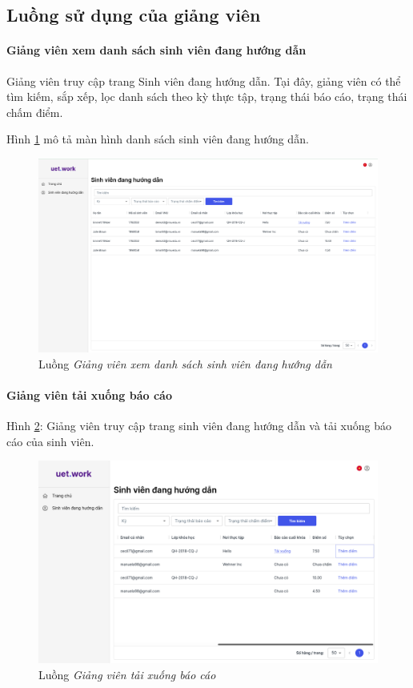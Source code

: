 \documentclass[./../main.tex]{subfiles}
\begin{document}
\subsection{Luồng sử dụng của giảng viên}

\paragraph*{Giảng viên xem danh sách sinh viên đang hướng dẫn}

Giảng viên truy cập trang Sinh viên đang hướng dẫn. Tại đây, giảng viên có thể tìm kiếm, sắp xếp, lọc danh sách theo kỳ thực tập, trạng thái báo cáo, trạng thái chấm điểm.

Hình \ref{fig:working_student_page} mô tả màn hình danh sách sinh viên đang hướng dẫn.

\begin{figure}[]
	\includegraphics[width=\linewidth]{./images/image8.png}
	\caption{Luồng \emph{Giảng viên xem danh sách sinh viên đang hướng dẫn}}
	\label{fig:working_student_page}
\end{figure}

\paragraph*{Giảng viên tải xuống báo cáo}
Hình \ref{fig:lecturer_access_students}: Giảng viên truy cập trang sinh viên đang hướng dẫn và tải xuống báo cáo của sinh viên. 

\begin{figure}[]
	\includegraphics[width=\linewidth]{./images/image64.png}
	\caption{Luồng \emph{Giảng viên tải xuống báo cáo}}
	\label{fig:lecturer_access_students}
\end{figure}
\end{document}
